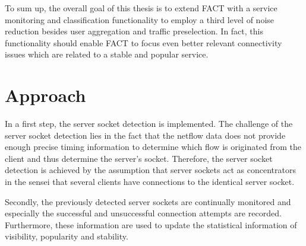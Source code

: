 \documentclass{sigcomm-alternate}
\begin{document}
%
%
To sum up, the overall goal of this thesis is to extend FACT with
a service monitoring and classification functionality to employ a
third level of noise reduction besides user aggregation and traffic
preselection. In fact, this functionality should enable FACT to focus
even better relevant connectivity issues which are related to a stable
and popular service.

\section{Approach}
In a first step, the server socket detection is implemented. The
challenge of the server socket detection lies in the fact that the
netflow data does not provide enough precise timing information to
determine which flow is originated from the client and thus determine
the server's socket. Therefore, the server socket detection is
achieved by the assumption that server sockets act as concentrators
in the sensei that several clients have connections to the identical
server socket.

Secondly, the previously detected server sockets are continually
monitored and especially the successful and unsuccessful connection
attempts are recorded. Furthermore, these information are used to update
the statistical information of visibility, popularity and stability.
\end{document}
